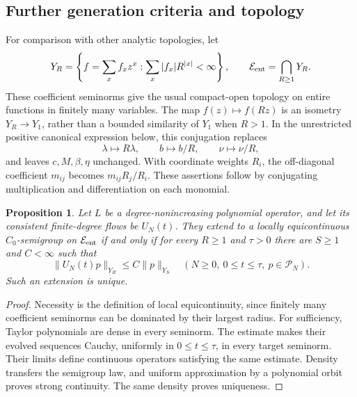\documentclass[reqno]{amsart}
\newtheorem{proposition}[theorem]{Proposition}
\theoremstyle{definition}
\theoremstyle{remark}
\begin{document}
\subsection{Further generation criteria and topology}

For comparison with other analytic topologies, let
\[
 Y_R=\left\{f=\sum_xf_xz^x:\sum_x|f_x|R^{|x|}<\infty\right\},
 \qquad \mathcal E_{\rm ent}=\bigcap_{R\ge1}Y_R .
\]
These coefficient seminorms give the usual compact-open topology on
entire functions in finitely many variables.  The map \(f(z)\mapsto f(Rz)\)
is an isometry \(Y_R\to Y_1\), rather than a bounded similarity of \(Y_1\)
when \(R>1\).  In the unrestricted positive canonical expression below,
this conjugation replaces
\[
 \lambda\mapsto R\lambda,\qquad b\mapsto b/R,\qquad
 \nu\mapsto\nu/R,
\]
and leaves \(c,M,\beta,\eta\) unchanged.  With coordinate weights \(R_i\),
the off-diagonal coefficient \(m_{ij}\) becomes \(m_{ij}R_j/R_i\).
These assertions follow by conjugating multiplication and differentiation
on each monomial.

\begin{proposition}\label{ana:entire-cutoff}
Let \(L\) be a degree-nonincreasing polynomial operator, and let its
consistent finite-degree flows be \(U_N(t)\).  They extend to a locally
equicontinuous \(C_0\)-semigroup on \(\mathcal E_{\rm ent}\) if and only if
for every \(R\ge1\) and \(\tau>0\) there are \(S\ge1\) and \(C<\infty\)
such that
\[
 \|U_N(t)p\|_{Y_R}\le C\|p\|_{Y_S}
 \quad(N\ge0,\ 0\le t\le\tau,\ p\in\mathcal P_N).
\]
Such an extension is unique.
\end{proposition}
\begin{proof}
Necessity is the definition of local equicontinuity, since finitely many
coefficient seminorms can be dominated by their largest radius.
For sufficiency, Taylor polynomials are dense in every seminorm.
The estimate makes their evolved sequences Cauchy, uniformly in
\(0\le t\le\tau\), in every target seminorm.  Their limits define
continuous operators satisfying the same estimate.  Density transfers
the semigroup law, and uniform approximation by a polynomial orbit
proves strong continuity.  The same density proves uniqueness.
\end{proof}
\end{document}
